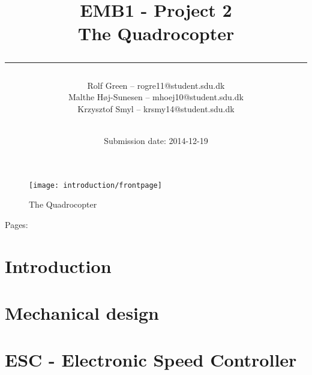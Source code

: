 


\usepackage{circuitikz}
\usepackage{pdflscape}

\title{EMB1 - Project 2\\ The Quadrocopter \rule{14cm}{0.5mm}}
\author{Rolf Green -- rogre11@student.sdu.dk\\ 
	Malthe Høj-Sunesen -- mhoej10@student.sdu.dk\\ 
	Krzysztof Smyl -- krsmy14@student.sdu.dk\\ 
        \rule{14cm}{0.5mm}}
\date{Submission date: 2014-12-19}



%
\maketitle %
\begin{figure}[H]
\centering
\texttt{[image: introduction/frontpage]}
\caption{The Quadrocopter}
\label{fig:frontpage}
\end{figure}
\begin{center}
Pages: \pageref{LastPage}
\end{center}
\newpage %
\newpage
{} %
\pagestyle{fancyplain}
\fancyhf{}
%
%
%
\begin{abstract}

\end{abstract}
\newpage
\tableofcontents
\newpage
%
\section{Introduction} \label{chap:intro}

%
\section{Mechanical design}

%
\newpage
\section{ESC - Electronic Speed Controller}


\newpage





